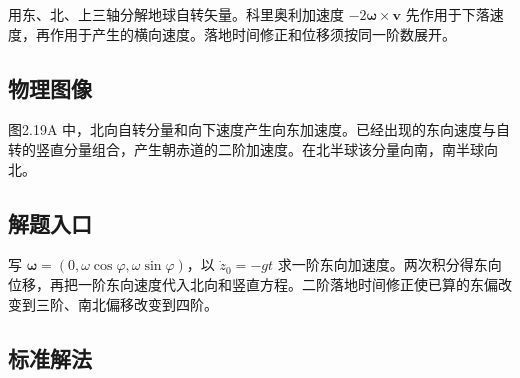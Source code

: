 \documentclass[UTF8,fontset=fandol,a4paper,11pt]{ctexart}
\newcommand{\vect}[1]{\bm{#1}}
\begin{document}
用东、北、上三轴分解地球自转矢量。科里奥利加速度 $-2\vect\omega\times\vect v$ 先作用于下落速度，再作用于产生的横向速度。落地时间修正和位移须按同一阶数展开。




\subsection*{物理图像}

图2.19A 中，北向自转分量和向下速度产生向东加速度。已经出现的东向速度与自转的竖直分量组合，产生朝赤道的二阶加速度。在北半球该分量向南，南半球向北。



\subsection*{解题入口}

写 $\vect\omega=(0,\omega\cos\varphi,\omega\sin\varphi)$，以 $\dot z_0=-gt$ 求一阶东向加速度。两次积分得东向位移，再把一阶东向速度代入北向和竖直方程。二阶落地时间修正使已算的东偏改变到三阶、南北偏移改变到四阶。



\subsection*{标准解法}
\end{document}
